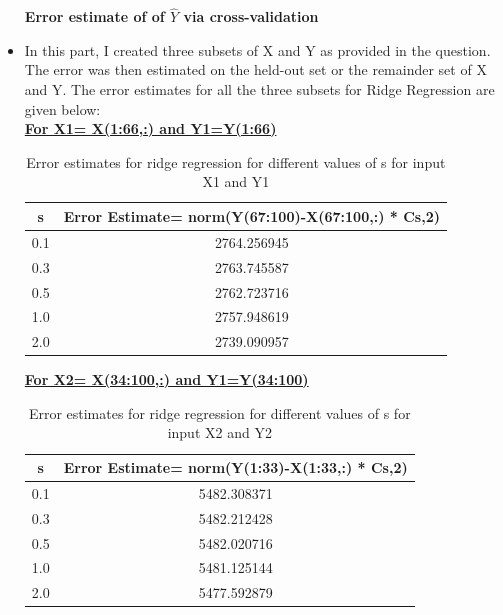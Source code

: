 \documentclass[11pt]{article}
\begin{document}
\begin{itemize}
		\textbf{Error estimate of of $\hat Y$ via cross-validation}
		
		\item[] In this part, I created three subsets of X and Y as provided in the question. The error was then estimated on the held-out set or the remainder set of X and Y. The error estimates for all the three subsets for Ridge Regression are given below: \\
		
		\textbf{\underline{For X1= X(1:66,:) and Y1=Y(1:66)}}
		\begin{table}[h]
			\centering
			\begin{tabular}{|c|c|}
				\hline
				\textbf{s}  & \textbf{Error Estimate= norm(Y(67:100)-X(67:100,:) * Cs,2)}\\
				\hline
				0.1 &  2764.256945  \\
				\hline
				0.3&  2763.745587 \\
				\hline
				0.5 &  2762.723716  \\
				\hline
				1.0 & 2757.948619  \\
				\hline
				2.0 & 2739.090957 \\
				\hline
			\end{tabular}
			\caption{Error estimates for ridge regression for different values of s for input X1 and Y1 }
			\label{t2}
		\end{table}
		
		\textbf{\underline{For X2= X(34:100,:) and Y1=Y(34:100)}}
		\begin{table}[h]
			\centering
			\begin{tabular}{|c|c|}
				\hline
				\textbf{s}  & \textbf{Error Estimate= norm(Y(1:33)-X(1:33,:) * Cs,2)}\\
				\hline
				0.1 &  5482.308371  \\
				\hline
				0.3&  5482.212428 \\
				\hline
				0.5 &  5482.020716  \\
				\hline
				1.0 & 5481.125144  \\
				\hline
				2.0 & 5477.592879 \\
				\hline
			\end{tabular}
			\caption{Error estimates for ridge regression for different values of s for input X2 and Y2 }
			\label{t2}
		\end{table}
		
		\pagebreak
		

\end{itemize}
\end{document}
